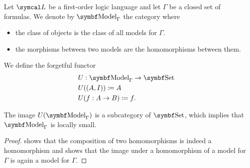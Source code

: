\begin{definition}\label{def:first_order_model_category}
  Let \( \Cal{L} \) be a first-order logic language and let \( \Gamma \) be a closed set of formulas. We denote by \( \Cat{Model}_\Gamma \) the category where
  \begin{itemize}
    \item the class of objects is the class of all models for \( \Gamma \).
    \item the morphisms between two models are the homomorphisms between them.
  \end{itemize}

  We define the forgetful functor
  \begin{align*}
    &U: \Cat{Model}_\Gamma \to \Bold{Set} \\
    &U((A, I)) \coloneqq A \\
    &U(f: A \to B) \coloneqq f.
  \end{align*}

  The image \( U(\Cat{Model}_\Gamma) \) is a subcategory of \( \Bold{Set} \), which implies that \( \Bold{Model}_\Gamma \) is locally small.
\end{definition}
\begin{proof}
   shows that the composition of two homomorphisms is indeed a homomorphism and  shows that the image under a homomorphism of a model for \( \Gamma \) is again a model for \( \Gamma \).
\end{proof}

